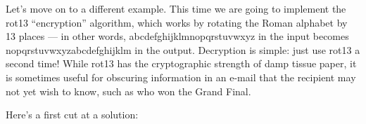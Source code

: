 \documentclass[a4paper,11pt,notitlepage,onecolumn]{book}
\begin{document}
Let's move on to a different example.  This time we are going to implement
the \textsf{rot13} ``encryption'' algorithm, which works by rotating the Roman
alphabet by 13 places --- in other words, \textsf{abcdefghijklmnopqrstuvwxyz} in
the input becomes \textsf{nopqrstuvwxyzabcdefghijklm} in the output.  Decryption is
simple: just use \textsf{rot13} a second time!  While \textsf{rot13} has the cryptographic
strength of damp tissue paper, it is sometimes useful for obscuring
information in an e-mail that the recipient may not yet wish to know,
such as who won the Grand Final.

Here's a first cut at a solution:
\begin{small}

\begin{ptabular}
\nextline
{}
\nextline
{}
\nextline
\nextline
{}
\nextline
\nextline
{}
\nextline
{}
\nextline
\nextline
{}
\nextline
{}
\nextline
{}
\nextline
{}
\nextline
{}
\nextline
{}
\nextline
{}
\nextline
{}
\nextline
{}
\nextline
{}
\nextline

\end{ptabular}
\end{small}
\end{document}
